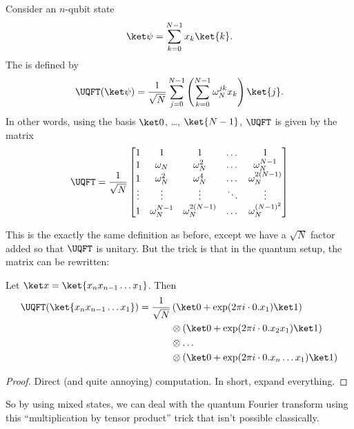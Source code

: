 \begin{definition}
	Consider an $n$-qubit state
	\[ \ket\psi = \sum_{k=0}^{N-1} x_k \ket{k}. \]
	The  is defined by
	\[
		\UQFT(\ket\psi) = \frac{1}{\sqrt N}\sum_{j=0}^{N-1}
		\left( \sum_{k=0}^{N-1} \omega_N^{jk} x_k \right) \ket{j}.
	\]
	In other words, using the basis $\ket0$, \dots, $\ket{N-1}$,
	$\UQFT$ is given by the matrix
	\[
		\UQFT = \frac{1}{\sqrt N}
		\begin{bmatrix}
			1 & 1 & 1 & \dots & 1 \\
			1 & \omega_N & \omega_N^2 & \dots & \omega_N^{N-1} \\
			1 & \omega_N^2 & \omega_N^4 & \dots & \omega_N^{2(N-1)} \\
			\vdots & \vdots & \vdots & \ddots & \vdots \\
			1 & \omega_N^{N-1} & \omega_N^{2(N-1)} & \dots & \omega_N^{(N-1)^2}
		\end{bmatrix}
	\]
\end{definition}
This is the exactly the same definition as before,
except we have a $\sqrt N$ factor added so that $\UQFT$ is unitary.
But the trick is that in the quantum setup, the matrix can be rewritten:
\begin{proposition}
	Let $\ket x = \ket{x_n x_{n-1} \dots x_1}$.
	Then
	\begin{align*}
		\UQFT( \ket{x_n x_{n-1} \dots x_1} )
		= \frac{1}{\sqrt N} &
		\left( \ket0 +\exp(2\pi i \cdot 0.x_1) \ket 1 \right) \\
		&\otimes \left( \ket0 +\exp(2\pi i \cdot 0.x_2x_1) \ket 1 \right) \\
		&\otimes \dots  \\
		&\otimes \left( \ket0 +\exp(2\pi i \cdot 0.x_n\dots x_1) \ket 1 \right)
	\end{align*}
\end{proposition}
\begin{proof}
	Direct (and quite annoying) computation.
	In short, expand everything.
\end{proof}

So by using mixed states, we can deal with the quantum Fourier transform
using this ``multiplication by tensor product'' trick that isn't possible classically.

